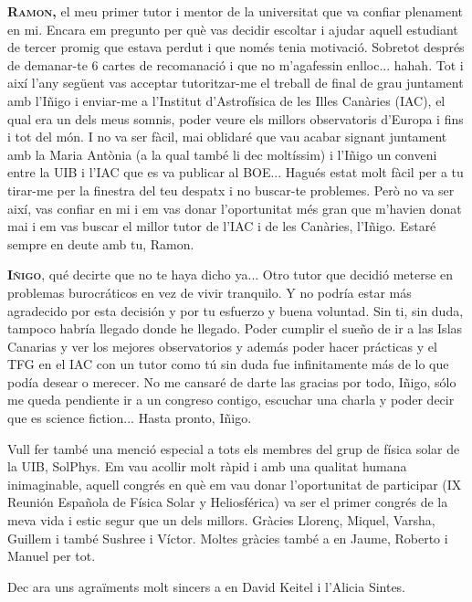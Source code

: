 \textsc{\textbf{Ramon,}} el meu primer tutor i mentor de la universitat que va confiar plenament en mi. Encara em pregunto per què vas decidir escoltar i ajudar aquell estudiant de tercer promig que estava perdut i que només tenia motivació. Sobretot després de demanar-te 6 cartes de recomanació i que no m'agafessin enlloc... hahah. Tot i així l'any següent vas acceptar tutoritzar-me el treball de final de grau juntament amb l'Iñigo i enviar-me a l'Institut d'Astrofísica de les Illes Canàries (IAC), el qual era un dels meus somnis, poder veure els millors observatoris d'Europa i fins i tot del món. I no va ser fàcil, mai oblidaré que vau acabar signant juntament amb la Maria Antònia (a la qual també li dec moltíssim) i l'Iñigo un conveni entre la UIB i l'IAC que es va publicar al BOE... Hagués estat molt fàcil per a tu tirar-me per la finestra del teu despatx i no buscar-te problemes. Però no va ser així, vas confiar en mi i em vas donar l'oportunitat més gran que m'havien donat mai i em vas buscar el millor tutor de l'IAC i de les Canàries, l'Iñigo. Estaré sempre en deute amb tu, Ramon.

\textsc{\textbf{Iñigo}}, qué decirte que no te haya dicho ya... Otro tutor que decidió meterse en problemas burocráticos en vez de vivir tranquilo. Y no podría estar más agradecido por esta decisión y por tu esfuerzo y buena voluntad. Sin ti, sin duda, tampoco habría llegado donde he llegado. Poder cumplir el sueño de ir a las Islas Canarias y ver los mejores observatorios y además poder hacer prácticas y el TFG en el IAC con un tutor como tú sin duda fue infinitamente más de lo que podía desear o merecer. No me cansaré de darte las gracias por todo, Iñigo, sólo me queda pendiente ir a un congreso contigo, escuchar una charla y poder decir que es science fiction... Hasta pronto, Iñigo.

Vull fer també una menció especial a tots els membres del grup de física solar de la UIB, SolPhys. Em vau acollir molt ràpid i amb una qualitat humana inimaginable, aquell congrés en què em vau donar l'oportunitat de participar (IX Reunión Española de Física Solar y Heliosférica) va ser el primer congrés de la meva vida i estic segur que un dels millors. Gràcies Llorenç, Miquel, Varsha, Guillem i també Sushree i Víctor. Moltes gràcies també a en Jaume, Roberto i Manuel per tot.


Dec ara uns agraïments molt sincers a en David Keitel i l'Alicia Sintes.

